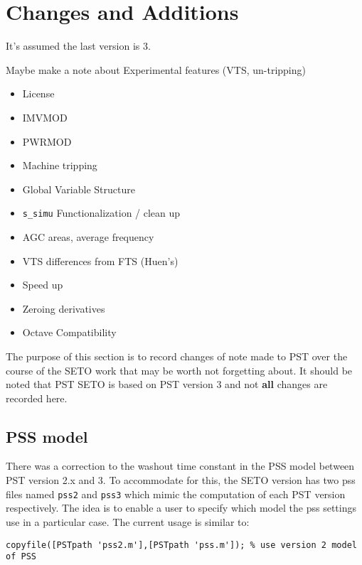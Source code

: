 \chapter{Changes and Additions}
It's assumed the last version is 3.


Maybe make a note about Experimental features (VTS, un-tripping)

\begin{itemize}
\item License
\item IMVMOD
\item PWRMOD
\item Machine tripping
\item Global Variable Structure
\item \verb|s_simu| Functionalization / clean up
\item AGC
\subitem areas, average frequency
\item VTS
\subitem differences from FTS (Huen's)
\item Speed up
\item Zeroing derivatives
\item Octave Compatibility
\end{itemize}


The purpose of this section is to record changes of note made to PST over the course of the SETO work that may be worth not forgetting about.
It should be noted that PST SETO is based on PST version 3 and not \textbf{all} changes are recorded here.

\section{PSS model}  
There was a correction to the washout time constant in the PSS model between PST version 2.x and 3.
To accommodate for this, the SETO version has two pss files named \verb|pss2| and \verb|pss3| which mimic the computation of each PST version respectively.
The idea is to enable a user to specify which model the pss settings use in a particular case.
The current usage is similar to:
\begin{verbatim}
copyfile([PSTpath 'pss2.m'],[PSTpath 'pss.m']); % use version 2 model of PSS
\end{verbatim}

